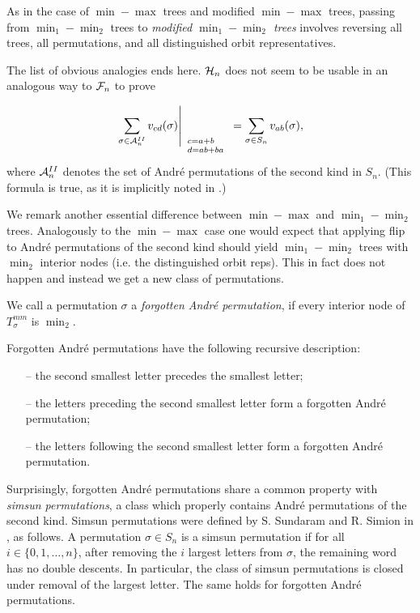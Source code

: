 As in the case of $\min-\max$ trees
and modified $\min-\max$ trees, passing from $\min_1-\min_2$ trees to {\em modified
$\min_1-\min_2$ trees} involves reversing all trees, all permutations,
and all distinguished orbit representatives. 

The list of obvious analogies ends here. ${\cal H}_n$ does not
seem to be usable in an analogous way to ${\cal F}_n$ to prove

$$
{ \left. {\sum_{\sigma \in {\cal A}^{II}_n}v_{cd}(\sigma)} \right|_{\begin{array}{l}\scriptstyle c = a+b\\[-4pt]\scriptstyle d = ab+ba\end{array}} }=
\sum_{\sigma \in S_n}v_{ab}(\sigma),
$$
where ${\cal A}^{II}_n$ denotes the set of Andr\'e permutations of the
second kind in $S_n$. (This formula is true, as it is implicitly noted in
\cite{Stanley}.)   

We  remark another essential difference between $\min-\max$
and $\min_1-\min_2$ trees. Analogously  to the $\min-\max$ case
one would expect that applying flip to Andr\'e permutations of the second 
kind should yield $\min_1-\min_2$ trees with $\min_2$ interior nodes (i.e.
the distinguished orbit reps). 
This in fact does not happen and instead we get a new class of permutations.


\begin{define}
We call a permutation $\sigma$ a {\em forgotten Andr\'e permutation}, if
every interior node of $T_{\sigma}^{mm}$ is $\min_2$.
\end{define}

Forgotten Andr\'e permutations have the following recursive description:
\begin{itemize}
\item[--] the second smallest letter precedes the smallest letter;
\item[--] the letters preceding the second smallest letter form a forgotten
Andr\'e permutation;
\item[--] the letters following the second smallest letter form a forgotten
Andr\'e permutation.  
\end{itemize}

Surprisingly, forgotten Andr\'e permutations share a common property
with {\em simsun permutations}, a class which properly contains Andr\'e
permutations of the second kind. Simsun permutations were defined by S.
Sundaram and R. Simion in \cite{Sundaram}, as follows. A permutation
$\sigma\in S_n$ is a simsun permutation if for
all $i\in\{0,1,\ldots, n\}$, after removing the $i$ largest letters from
$\sigma$, the remaining word has no double descents. In particular, the
class of simsun permutations is closed under removal of the largest
letter. The same holds for forgotten Andr\'e permutations.

